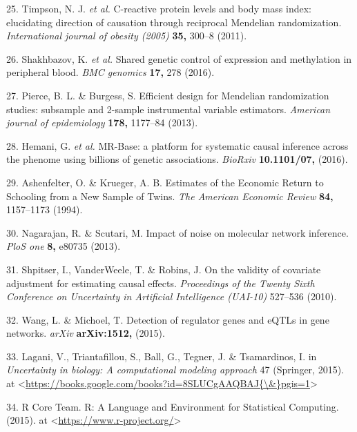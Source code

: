 \documentclass[]{article}
\begin{document}
\hypertarget{ref-Timpson2011}{}
25. Timpson, N. J. \emph{et al.} C-reactive protein levels and body mass
index: elucidating direction of causation through reciprocal Mendelian
randomization. \emph{International journal of obesity (2005)}
\textbf{35,} 300--8 (2011).

\hypertarget{ref-Shakhbazov2016}{}
26. Shakhbazov, K. \emph{et al.} Shared genetic control of expression
and methylation in peripheral blood. \emph{BMC genomics} \textbf{17,}
278 (2016).

\hypertarget{ref-Pierce2013}{}
27. Pierce, B. L. \& Burgess, S. Efficient design for Mendelian
randomization studies: subsample and 2-sample instrumental variable
estimators. \emph{American journal of epidemiology} \textbf{178,}
1177--84 (2013).

\hypertarget{ref-Hemani2016}{}
28. Hemani, G. \emph{et al.} MR-Base: a platform for systematic causal
inference across the phenome using billions of genetic associations.
\emph{BioRxiv} \textbf{10.1101/07,} (2016).

\hypertarget{ref-Ashenfelter1994}{}
29. Ashenfelter, O. \& Krueger, A. B. Estimates of the Economic Return
to Schooling from a New Sample of Twins. \emph{The American Economic
Review} \textbf{84,} 1157--1173 (1994).

\hypertarget{ref-Nagarajan2013}{}
30. Nagarajan, R. \& Scutari, M. Impact of noise on molecular network
inference. \emph{PloS one} \textbf{8,} e80735 (2013).

\hypertarget{ref-Shpitser2010}{}
31. Shpitser, I., VanderWeele, T. \& Robins, J. On the validity of
covariate adjustment for estimating causal effects. \emph{Proceedings of
the Twenty Sixth Conference on Uncertainty in Artificial Intelligence
(UAI-10)} 527--536 (2010).

\hypertarget{ref-Wang2015}{}
32. Wang, L. \& Michoel, T. Detection of regulator genes and eQTLs in
gene networks. \emph{arXiv} \textbf{arXiv:1512,} (2015).

\hypertarget{ref-Lagani2015}{}
33. Lagani, V., Triantafillou, S., Ball, G., Tegner, J. \& Tsamardinos,
I. in \emph{Uncertainty in biology: A computational modeling approach}
47 (Springer, 2015). at
\textless{}\href{https://books.google.com/books?id=8SLUCgAAQBAJ\%7B/\&\%7Dpgis=1}{https://books.google.com/books?id=8SLUCgAAQBAJ\{\textbackslash{}\&\}pgis=1}\textgreater{}

\hypertarget{ref-RCoreTeam2015}{}
34. R Core Team. R: A Language and Environment for Statistical
Computing. (2015). at
\textless{}\url{https://www.r-project.org/}\textgreater{}
\end{document}
